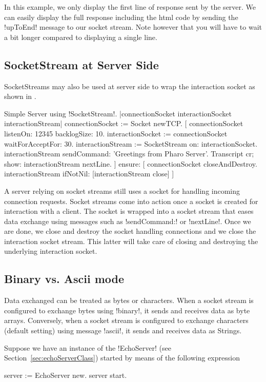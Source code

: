 \documentclass[a4paper,10pt,twoside]{book}
\begin{document}
In this example, we only display the first line of response sent by the server.
We can easily display the full response including the html code by sending the \ct!upToEnd! message to our socket stream.
Note however that you will have to wait a bit longer compared to displaying a single line.

\subsection{SocketStream at Server Side}
SocketStreams may also be used at server side to wrap the interaction socket as shown in .

\begin{script}{Simple Server using \ct!SocketStream!.}
|connectionSocket interactionSocket interactionStream|
connectionSocket := Socket newTCP. 
[
	connectionSocket listenOn: 12345 backlogSize: 10. 
	interactionSocket := connectionSocket waitForAcceptFor: 30. 
	interactionStream := SocketStream on: interactionSocket.
	interactionStream sendCommand: 'Greetings from Pharo Server'.
	Transcript cr; show: interactionStream nextLine.
] ensure: [
	connectionSocket closeAndDestroy.
	interactionStream ifNotNil: [interactionStream close]
]
\end{script}

A server relying on socket streams still uses a socket for handling incoming connection requests.
Socket streams come into action once a socket is created for interaction with a client.
The socket is wrapped into a socket stream that eases data exchange using messages such as \ct!sendCommand:! or \ct!nextLine!.
Once we are done, we close and destroy the socket handling connections and we close the interaction socket stream.
This latter will take care of closing and destroying the underlying interaction socket.

\subsection{Binary vs. Ascii mode}
Data exchanged can be treated as bytes or characters. When a socket stream is configured to exchange bytes using \ct!binary!, it sends and receives data as byte arrays.
Conversely, when a socket stream is configured to exchange characters (default setting) using message \ct!ascii!, it sends and receives data as Strings.

Suppose we have an instance of the \ct!EchoServer! (see Section~\ref{sec:echoServerClass}) started by means of the following expression
\begin{code}{}
server := EchoServer new.
server start.
\end{code}
\end{document}
